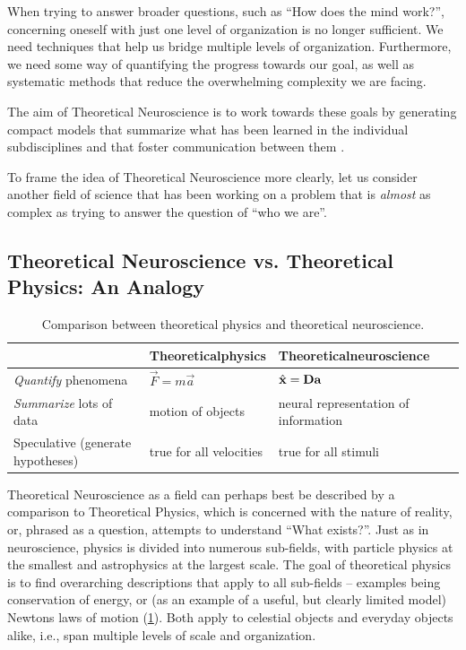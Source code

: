 \documentclass[10pt,letterpaper,oneside]{article}
\begin{document}
When trying to answer broader questions, such as \enquote{How does the mind work?}, concerning oneself with just one level of organization is no longer sufficient. We need techniques that help us bridge multiple levels of organization. Furthermore, we need some way of quantifying the progress towards our goal, as well as systematic methods that reduce the overwhelming complexity we are facing.

The aim of Theoretical Neuroscience is to work towards these goals by generating compact models that summarize what has been learned in the individual subdisciplines and that foster communication between them \cite{abbott2001theoretical}.

To frame the idea of Theoretical Neuroscience more clearly, let us consider another field of science that has been working on a problem that is \emph{almost} as complex as trying to answer the question of \enquote{who we are}.

\subsection{Theoretical Neuroscience vs. Theoretical Physics: An Analogy}

\begin{table}[h]
	\centering
	\caption{Comparison between theoretical physics and theoretical neuroscience.}
	\begin{tabular}{p{4cm} p{4cm} p{4cm}}
		\toprule
								  &
								  \textbf{Theoretical\newline physics} & \textbf{Theoretical\newline neuroscience} \\
		\midrule
		\raggedleft\emph{Quantify} phenomena & $\vec{F} = m \vec{a}$ & $\hat{{\mathbf{x}}} = {\mathbf{D}} {\mathbf{a}}$ \\
		\midrule
		\raggedleft \emph{Summarize} lots of data & motion of objects & neural representation of information \\
		\midrule
		\raggedleft Speculative (generate hypotheses) & true for all velocities & true for all stimuli \\
		\bottomrule
	\end{tabular}
	\label{tbl:physics_vs_theoretical_neuroscience}
\end{table}

Theoretical Neuroscience as a field can perhaps best be described by a comparison to Theoretical Physics, which is concerned with the nature of reality, or, phrased as a question, attempts to understand \enquote{What exists?}. Just as in neuroscience, physics is divided into numerous sub-fields, with particle physics at the smallest and astrophysics at the largest scale. The goal of theoretical physics is to find overarching descriptions that apply to all sub-fields -- examples being conservation of energy, or (as an example of a useful, but clearly limited model) Newtons laws of motion (\cref{tbl:physics_vs_theoretical_neuroscience}). Both apply to celestial objects and everyday objects alike, i.e., span multiple levels of scale and organization.
\end{document}
